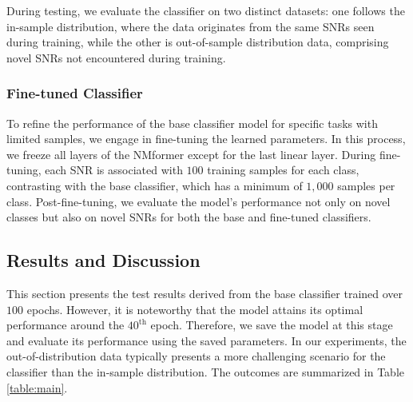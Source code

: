 During testing, we evaluate the classifier on two distinct datasets: one follows the in-sample distribution, where the data originates from the same SNRs seen during training, while the other is out-of-sample distribution data, comprising novel SNRs not encountered during training.

\subsubsection{Fine-tuned Classifier}

To refine the performance of the base classifier model for specific tasks with limited samples, we engage in fine-tuning the learned parameters. In this process, we freeze all layers of the NMformer except for the last linear layer. During fine-tuning, each SNR is associated with $100$ training samples for each class, contrasting with the base classifier, which has a minimum of $1,000$ samples per class. Post-fine-tuning, we evaluate the model's performance not only on novel classes but also on novel SNRs for both the base and fine-tuned classifiers. 

\subsection{Results and Discussion}

This section presents the test results derived from the base classifier trained over $100$ epochs. However, it is noteworthy that the model attains its optimal performance around the $40^{\mathrm{th}}$ epoch. Therefore, we save the model at this stage and evaluate its performance using the saved parameters. In our experiments, the out-of-distribution data typically presents a more challenging scenario for the classifier than the in-sample distribution. The outcomes are summarized in Table \ref{table:main}.

